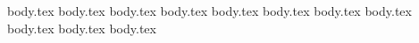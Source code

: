 \chapter{\fivesecc{}}
{body.tex}
{body.tex}
{body.tex}
{body.tex}
{body.tex}
{body.tex}
{body.tex}
{body.tex}
{body.tex}
{body.tex}
{body.tex}